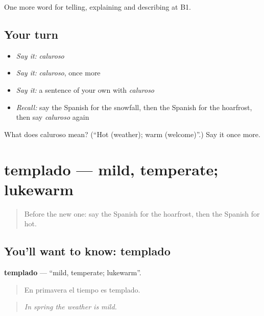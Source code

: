 \begin{grammarlens}[title={What you've built}]
One more word for telling, explaining and describing at B1.
\end{grammarlens}

\subsection*{Your turn}
\begin{itemize}
\raggedright
  \item \emph{Say it:} \emph{caluroso}
  \item \emph{Say it:} \emph{caluroso}, once more
  \item \emph{Say it:} a sentence of your own with \emph{caluroso}
  \item \emph{Recall:} say the Spanish for the snowfall, then the Spanish for the hoarfrost, then say \emph{caluroso} again
\end{itemize}

\begin{tcolorbox}[breakable,colback=teal!4,colframe=teal!35!black,title={Before you move on}]
What does caluroso mean? (\textquotedblleft{}Hot (weather); warm (welcome)\textquotedblright{}.) Say it once more.
\end{tcolorbox}
\section[templado]{templado — mild, temperate; lukewarm}

\label{lesson:ES-C701-templado}



\begin{quote}
Before the new one: say the Spanish for the hoarfrost, then the Spanish for hot.
\end{quote}

\subsection*{You'll want to know: templado}
\textbf{templado} — \textquotedblleft{}mild, temperate; lukewarm\textquotedblright{}.

\begin{quote}
En primavera el tiempo es templado.
\end{quote}

\begin{quote}
\emph{In spring the weather is mild.}
\end{quote}

